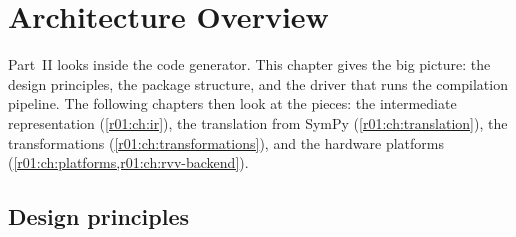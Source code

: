 \chapter{Architecture Overview}\label{r01:ch:architecture}

Part~II looks inside the code generator. This chapter gives the big picture: the
design principles, the package structure, and the driver that runs the compilation
pipeline. The following chapters then look at the pieces: the intermediate
representation (\cref{r01:ch:ir}), the translation from SymPy (\cref{r01:ch:translation}), the
transformations (\cref{r01:ch:transformations}), and the hardware platforms
(\cref{r01:ch:platforms,r01:ch:rvv-backend}).

\section{Design principles}

